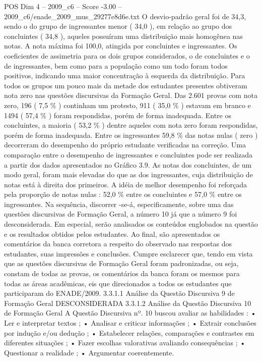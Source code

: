 \begin{textsample}{POS Dim 4 – 2009\_c6 – Score -3.00 – 2009\_c6/enade\_2009\_mus\_29277e8d6e.txt}
O desvio-padrão geral foi de 34,3, sendo o do grupo de ingressantes menor ( 34,0 ), em relação ao grupo dos concluintes ( 34,8 ), aqueles possuíram uma distribuição mais homogênea nas notas.
A nota máxima foi 100,0, atingida por concluintes e ingressantes.
Os coeficientes de assimetria para os dois grupos considerados, o de concluintes e o de ingressantes, bem como para a população como um todo foram todos positivos, indicando uma maior concentração à esquerda da distribuição.
Para todos os grupos um pouco mais da metade dos estudantes presentes obtiveram nota zero nas questões discursivas da Formação Geral.
Das 2.601 provas com nota zero, 196 ( 7,5 \% ) continham um protesto, 911 ( 35,0 \% ) estavam em branco e 1494 ( 57,4 \% ) foram respondidas, porém de forma inadequada.
Entre os concluintes, a maioria ( 53,2 \% ) dentre aqueles com nota zero foram respondidas, porém de forma inadequada.
Entre os ingressantes 59,8 \% das notas nulas ( zero ) decorreram do desempenho do próprio estudante verificadas na correção.
Uma comparação entre o desempenho de ingressantes e concluintes pode ser realizada a partir dos dados apresentados no Gráfico 3.9.
As notas dos concluintes, de um modo geral, foram mais elevadas do que as dos ingressantes, cuja distribuição de notas está à direita dos primeiros.
A idéia de melhor desempenho foi reforçada pela proporção de notas nulas : 52,0 \% entre os concluintes e 57,0 \% entre os ingressantes.
Na sequência, discorrer -se-á, especificamente, sobre uma das questões discursivas de Formação Geral, a número 10 já que a número 9 foi desconsiderada.
Em especial, serão analisados os conteúdos englobados na questão e os resultados obtidos pelos estudantes.
Ao final, são apresentados os comentários da banca corretora a respeito do observado nas respostas dos estudantes, suas impressões e conclusões.
Cumpre esclarecer que, tendo em vista que as questões discursivas de Formação Geral foram padronizadas, ou seja, constam de todas as provas, os comentários da banca foram os mesmos para todas as áreas acadêmicas, eis que direcionados a todos os estudantes que participaram do ENADE/2009. 3.3.1.1 Análise da Questão Discursiva 9 de Formação Geral DESCONSIDERADA 3.3.1.2 Análise da Questão Discursiva 10 de Formação Geral A Questão Discursiva nº. 10 buscou avaliar as habilidades : • Ler e interpretar textos ; • Analisar e criticar informações ; • Extrair conclusões por indução e/ou dedução ; • Estabelecer relações, comparações e contrastes em diferentes situações ; • Fazer escolhas valorativas avaliando consequências ; • Questionar a realidade ; • Argumentar coerentemente.

\end{textsample}
